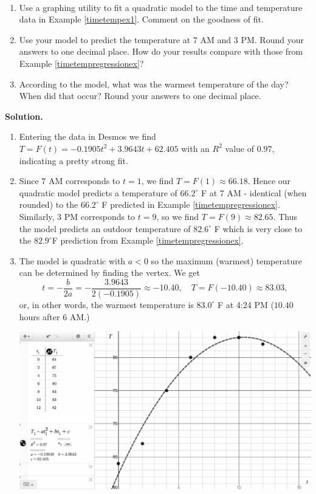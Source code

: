 \begin{ex} \label{TimeTempQRex} $~$

\begin{enumerate}

\item Use a graphing utility to fit a quadratic model to the time and temperature data in Example \ref{timetempex1}.  Comment on the goodness of fit.  

\item  Use your model to predict the temperature at 7 AM and 3 PM.  Round your answers to one decimal place.  How do your results compare with those from Example \ref{timetempregressionex}?

\item  According to the model, what was the warmest temperature of the day?  When did that occur?  Round your answers to one decimal place.

\end{enumerate}

{\bf Solution.}

\begin{enumerate}

\item Entering the data in Desmos we find  $T = F(t)  = -0.1905t^2+ 3.9643t+62.405$ with an $R^2$ value of $0.97$, indicating a pretty strong fit.  

\item Since $7$ AM corresponds to $t=1$, we find $T = F(1) \approx 66.18$.   Hence our quadratic model predicts a temperature of  $66.2^{\circ}$ F at 7 AM - identical (when rounded) to the  $66.2^{\circ}$ F predicted in Example \ref{timetempregressionex}.  Similarly, $3$ PM corresponds to $t = 9$, so we find  $T = F(9) \approx 82.65$.  Thus the model predicts an outdoor temperature of $82.6^{\circ}$ F which is very close to the $82.9^{\circ}$F prediction from Example \ref{timetempregressionex}.

\item The model is quadratic with $a<0$ so the maximum (warmest) temperature can be determined by finding the vertex.  We get \[ t = -\dfrac{b}{2a} = - \dfrac{3.9643}{2( -0.1905)}  \approx -10.40, \quad T = F(-10.40) \approx 83.03,\] or, in other words, the warmest temperature is $83.0^{\circ}$ F at 4:24 PM ($10.40$ hours after 6 AM.)

\begin{center}

 \includegraphics[width=5in]{./QuadraticFunctionsGraphics/TimeTempDataQR.jpg}
 

\end{center}
\end{enumerate}
\end{ex}
